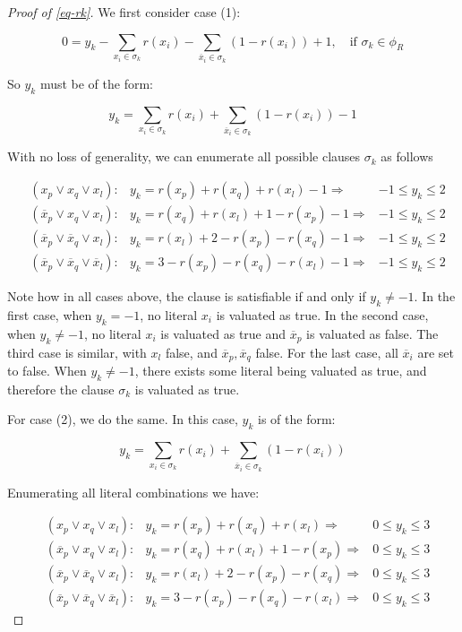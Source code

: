 \documentclass{amsart}
\newcommand{\ov}{\overline}
\theoremstyle{plain}
\numberwithin{equation}{section}
\renewcommand{\implies}{\Rightarrow}
\begin{document}
\begin{proof}[Proof of \autoref{eq-rk}]
  We first consider case (1):

  \begin{equation*}
    0 = y_k-\sum_{x_i\in\sigma_k} r(x_i)-\sum_{\ov{x}_i\in\sigma_k} (1-r(x_i))+1,\quad\text{if }
    \sigma_k\in\phi_R
  \end{equation*}

  So $y_k$ must be of the form:

  \begin{equation*}
    y_k=\sum_{x_i\in\sigma_k} r(x_i)+\sum_{\ov{x}_i\in\sigma_k} (1-r(x_i))-1
  \end{equation*}

  With no loss of generality, we can enumerate all possible clauses $\sigma_k$ as follows

  \begin{align*}
    &(x_p\vee x_q\vee x_l): &y_k=r(x_p)+r(x_q)+r(x_l)-1\implies &-1\leq y_k\leq 2\\
    &(\ov{x}_p\vee x_q\vee x_l): &y_k=r(x_q)+r(x_l)+1-r(x_p)-1\implies &-1\leq y_k\leq 2\\
    &(\ov{x}_p\vee\ov{x}_q\vee x_l):&y_k=r(x_l)+2-r(x_p)-r(x_q)-1\implies &-1\leq y_k\leq 2\\
    &(\ov{x}_p\vee\ov{x}_q\vee\ov{x}_l):&y_k=3-r(x_p)-r(x_q)-r(x_l)-1\implies &-1\leq y_k\leq 2
  \end{align*}

  Note how in all cases above, the clause is satisfiable if and only if $y_k\neq -1$. In the first
  case, when $y_k=-1$, no literal $x_i$ is valuated as true. In the second case, when $y_k\neq -1$,
  no literal $x_i$ is valuated as true and $\ov{x}_p$ is valuated as false. The third case is
  similar, with $x_l$ false, and $\ov{x}_p,\ov{x}_q$ false. For the last case, all $\ov{x}_i$ are
  set to false. When $y_k\neq -1$, there exists some literal being valuated as true, and therefore
  the clause $\sigma_k$ is valuated as true.

  For case (2), we do the same. In this case, $y_k$ is of the form:

  \begin{equation*}
    y_k=\sum_{x_i\in\sigma_k} r(x_i)+\sum_{\ov{x}_i\in\sigma_k} (1-r(x_i))
  \end{equation*}

  Enumerating all literal combinations we have:

  \begin{align*}
    &(x_p\vee x_q\vee x_l): &y_k=r(x_p)+r(x_q)+r(x_l)\implies &0\leq y_k\leq 3\\
    &(\ov{x}_p\vee x_q\vee x_l): &y_k=r(x_q)+r(x_l)+1-r(x_p)\implies &0\leq y_k\leq 3\\
    &(\ov{x}_p\vee\ov{x}_q\vee x_l):&y_k=r(x_l)+2-r(x_p)-r(x_q)\implies &0\leq y_k\leq 3\\
    &(\ov{x}_p\vee\ov{x}_q\vee\ov{x}_l):&y_k=3-r(x_p)-r(x_q)-r(x_l)\implies &0\leq y_k\leq 3
  \end{align*}


\end{proof}
\end{document}
